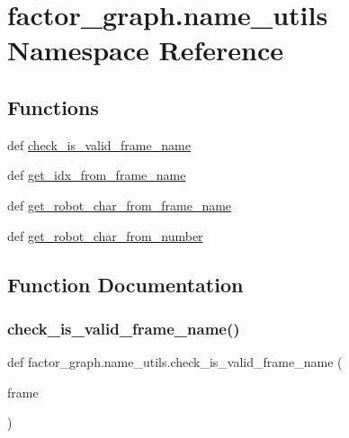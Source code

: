 \hypertarget{namespacefactor__graph_1_1name__utils}{}\section{factor\+\_\+graph.\+name\+\_\+utils Namespace Reference}
\label{namespacefactor__graph_1_1name__utils}
\subsection*{Functions}
\begin{DoxyCompactItemize}
\item
def \hyperlink{namespacefactor__graph_1_1name__utils_ae234355bacfea5d5e78f8983be793eb5}{check\+\_\+is\+\_\+valid\+\_\+frame\+\_\+name}
\item
def \hyperlink{namespacefactor__graph_1_1name__utils_a6e40d27daa670f1b0ceaf6b30121b047}{get\+\_\+idx\+\_\+from\+\_\+frame\+\_\+name}
\item
def \hyperlink{namespacefactor__graph_1_1name__utils_ad6de4bae1a800c58cde48292838ab10a}{get\+\_\+robot\+\_\+char\+\_\+from\+\_\+frame\+\_\+name}
\item
def \hyperlink{namespacefactor__graph_1_1name__utils_a0d6035e663634e26af89e0f0336c95c0}{get\+\_\+robot\+\_\+char\+\_\+from\+\_\+number}
\end{DoxyCompactItemize}


\subsection{Function Documentation}
\mbox{\label{namespacefactor__graph_1_1name__utils_ae234355bacfea5d5e78f8983be793eb5}}
\subsubsection{\texorpdfstring{check\+\_\+is\+\_\+valid\+\_\+frame\+\_\+name()}{check\_is\_valid\_frame\_name()}}
{\footnotesize\ttfamily def factor\+\_\+graph.\+name\+\_\+utils.\+check\+\_\+is\+\_\+valid\+\_\+frame\+\_\+name (\begin{DoxyParamCaption}\item[{}]{frame }\end{DoxyParamCaption})}

